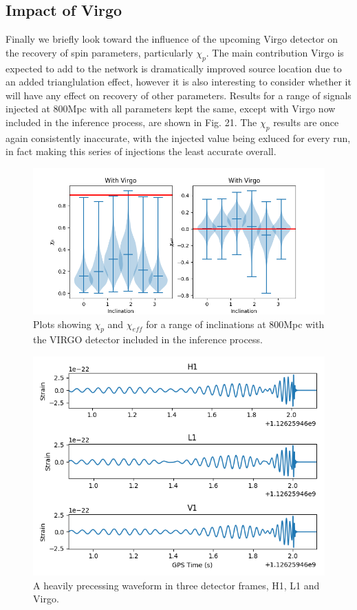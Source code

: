 \documentclass[11pt]{article}
\begin{document}
\subsection{Impact of Virgo}
Finally we briefly look toward the influence of the upcoming Virgo detector on the recovery of spin parameters, particularly $\chi_p$. The main contribution Virgo is expected to add to the network is dramatically improved source location due to an added trianglulation effect, however it is also interesting to consider whether it will have any effect on recovery of other parameters. Results for a range of signals injected at 800Mpc with all parameters kept the same, except with Virgo now included in the inference process, are shown in Fig. 21. The $\chi_p$ results are once again consistently inaccurate, with the injected value being exluced for every run, in fact making this series of injections the least accurate overall. 
\begin{figure}[H]
	\includegraphics[width=1\textwidth]{fig21.png}
	\centering
	\caption{Plots showing $\chi_p$ and $\chi_{eff}$ for a range of inclinations at 800Mpc with the VIRGO detector included in the inference process.}
	\centering
\end{figure}
\begin{figure}[H]
	\includegraphics[width=1\textwidth]{fig22.png}
	\centering
	\caption{A heavily precessing waveform in three detector frames, H1, L1 and Virgo.}
	\centering
\end{figure}
\end{document}
